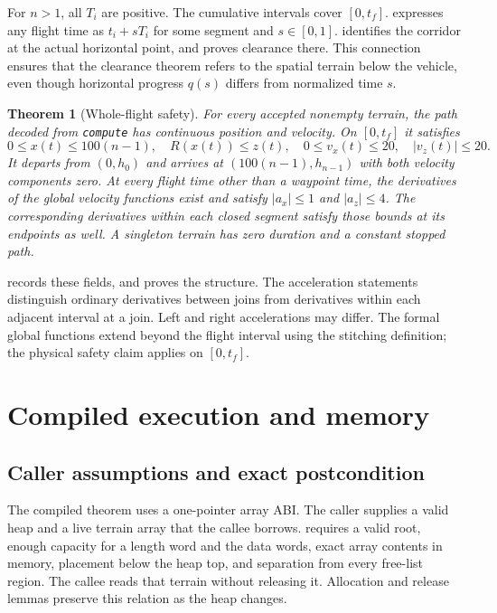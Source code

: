 \documentclass[11pt]{article}
\newtheorem{theorem}{Theorem}
\begin{document}
For $n>1$, all $T_i$ are positive.  The cumulative intervals cover $[0,t_f]$.   expresses any flight time as $t_i+sT_i$ for some segment and $s\in[0,1]$.   identifies the corridor at the actual horizontal point, and  proves clearance there.  This connection ensures that the clearance theorem refers to the spatial terrain below the vehicle, even though horizontal progress $q(s)$ differs from normalized time $s$.

\begin{theorem}[Whole-flight safety]
For every accepted nonempty terrain, the path decoded from \textup{\texttt{compute}} has continuous position and velocity.  On $[0,t_f]$ it satisfies
\[
 0\leq x(t)\leq100(n-1),\quad R(x(t))\leq z(t),\quad
 0\leq v_x(t)\leq20,\quad |v_z(t)|\leq20.
\]
It departs from $(0,h_0)$ and arrives at $(100(n-1),h_{n-1})$ with both velocity components zero.  At every flight time other than a waypoint time, the derivatives of the global velocity functions exist and satisfy $|a_x|\leq1$ and $|a_z|\leq4$.  The corresponding derivatives within each closed segment satisfy those bounds at its endpoints as well.  A singleton terrain has zero duration and a constant stopped path.
\end{theorem}

 records these fields, and  proves the structure.  The acceleration statements distinguish ordinary derivatives between joins from derivatives within each adjacent interval at a join.  Left and right accelerations may differ.  The formal global functions extend beyond the flight interval using the stitching definition; the physical safety claim applies on $[0,t_f]$.

\section{Compiled execution and memory}
\label{sec:execution}

\subsection{Caller assumptions and exact postcondition}

The compiled theorem uses a one-pointer array ABI.  The caller supplies a valid heap and a live terrain array that the callee borrows.   requires a valid root, enough capacity for a length word and the data words, exact array contents in memory, placement below the heap top, and separation from every free-list region.  The callee reads that terrain without releasing it.  Allocation and release lemmas preserve this relation as the heap changes.
\end{document}
